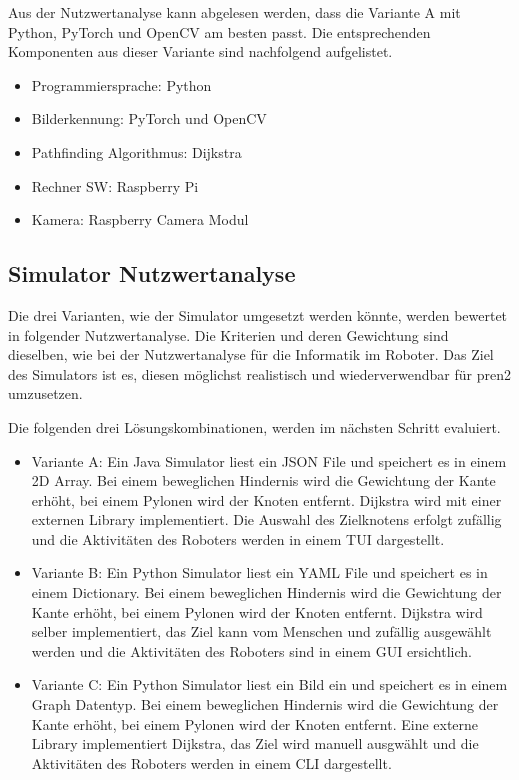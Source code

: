 Aus der Nutzwertanalyse kann abgelesen werden, dass die Variante A mit Python, PyTorch und OpenCV am besten passt. Die entsprechenden Komponenten aus dieser Variante sind nachfolgend aufgelistet.

\begin{itemize}
    \item Programmiersprache: Python
    \item Bilderkennung: PyTorch und OpenCV
    \item Pathfinding Algorithmus: Dijkstra
    \item Rechner SW: Raspberry Pi
    \item Kamera: Raspberry Camera Modul
\end{itemize}

\subsection{Simulator Nutzwertanalyse}

Die drei Varianten, wie der Simulator umgesetzt werden könnte, werden bewertet in folgender Nutzwertanalyse. Die Kriterien und deren Gewichtung sind dieselben, wie bei der Nutzwertanalyse für die Informatik im Roboter. Das Ziel des Simulators ist es, diesen möglichst realistisch und wiederverwendbar für \acrshort{pren2} umzusetzen.


Die folgenden drei Lösungskombinationen, werden im nächsten Schritt evaluiert.

\begin{itemize}
    \item Variante A: Ein Java Simulator liest ein JSON File und speichert es in einem 2D Array. Bei einem beweglichen Hindernis wird die Gewichtung der Kante erhöht, bei einem Pylonen wird der Knoten entfernt. Dijkstra wird mit einer externen Library implementiert. Die Auswahl des Zielknotens erfolgt zufällig und die Aktivitäten des Roboters werden in einem TUI dargestellt.
    \item Variante B: Ein Python Simulator liest ein YAML File und speichert es in einem Dictionary. Bei einem beweglichen Hindernis wird die Gewichtung der Kante erhöht, bei einem Pylonen wird der Knoten entfernt. Dijkstra wird selber implementiert, das Ziel kann vom Menschen und zufällig ausgewählt werden und die Aktivitäten des Roboters sind in einem GUI ersichtlich.
    \item Variante C: Ein Python Simulator liest ein Bild ein und speichert es in einem Graph Datentyp. Bei einem beweglichen Hindernis wird die Gewichtung der Kante erhöht, bei einem Pylonen wird der Knoten entfernt. Eine externe Library implementiert Dijkstra, das Ziel wird manuell ausgwählt und die Aktivitäten des Roboters werden in einem CLI dargestellt.
\end{itemize}

